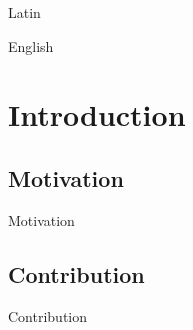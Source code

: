 \begin{savequote}[8cm]
    \textlatin{Latin}
    
    English
\end{savequote}
    
\chapter{\label{intro}Introduction} 
    
\minitoc

\section{Motivation}

    Motivation

\section{Contribution}

    Contribution